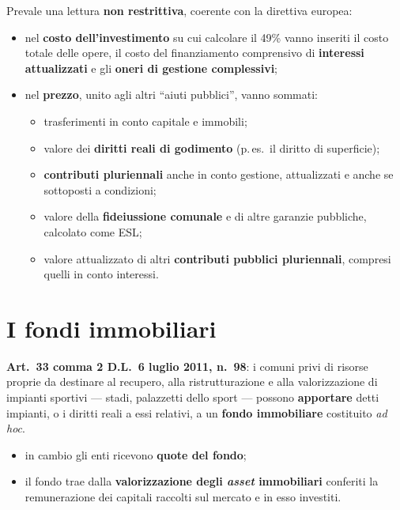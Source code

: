 
Prevale una lettura \textbf{non restrittiva}, coerente con la direttiva europea:

\begin{itemize}
  \item nel \textbf{costo dell'investimento} su cui calcolare il 49\% vanno inseriti il costo
    totale delle opere, il costo del finanziamento comprensivo di \textbf{interessi attualizzati} e
    gli \textbf{oneri di gestione complessivi};
  \item nel \textbf{prezzo}, unito agli altri ``aiuti pubblici'', vanno sommati:
    \begin{itemize}
      \item trasferimenti in conto capitale e immobili;
      \item valore dei \textbf{diritti reali di godimento} (p.\,es.\ il diritto di superficie);
      \item \textbf{contributi pluriennali} anche in conto gestione, attualizzati e anche se
        sottoposti a condizioni;
      \item valore della \textbf{fideiussione comunale} e di altre garanzie pubbliche, calcolato
        come ESL;
      \item valore attualizzato di altri \textbf{contributi pubblici pluriennali}, compresi quelli
        in conto interessi.
    \end{itemize}
\end{itemize}


\section{I fondi immobiliari}

\textbf{Art.\ 33 comma 2 D.L.\ 6 luglio 2011, n.\ 98}: i comuni privi di risorse proprie da
destinare al recupero, alla ristrutturazione e alla valorizzazione di impianti sportivi --- stadi,
palazzetti dello sport --- possono \textbf{apportare} detti impianti, o i diritti reali a essi
relativi, a un \textbf{fondo immobiliare} costituito \textit{ad hoc}.

\begin{itemize}
  \item in cambio gli enti ricevono \textbf{quote del fondo};
  \item il fondo trae dalla \textbf{valorizzazione degli \textit{asset} immobiliari} conferiti la
    remunerazione dei capitali raccolti sul mercato e in esso investiti.
\end{itemize}

